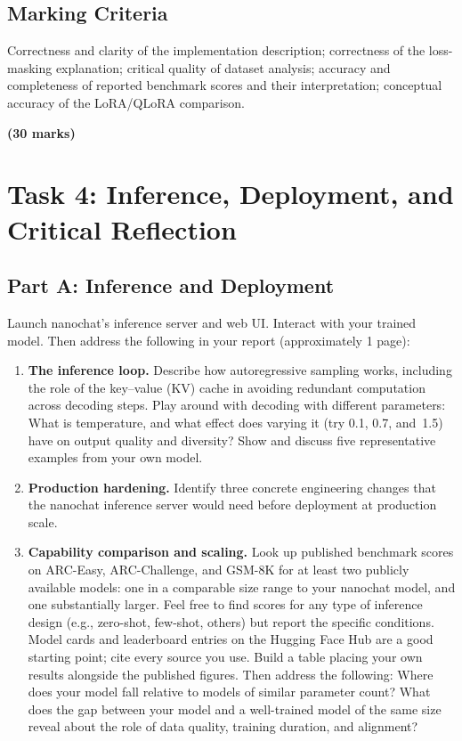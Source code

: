 \subsection{Marking Criteria}

Correctness and clarity of the implementation description; correctness of the loss-masking explanation; critical quality of dataset analysis; accuracy and completeness of reported benchmark scores and their interpretation; conceptual accuracy of the LoRA/QLoRA comparison.

\noindent\textbf{(30 marks)}

\section{Task 4: Inference, Deployment, and Critical Reflection}
\label{sec:task4}

\subsection{Part A: Inference and Deployment}

Launch nanochat's inference server and web UI. Interact with your trained model. Then address the following in your report (approximately 1 page):

\begin{enumerate}
    \item \textbf{The inference loop.}  Describe how autoregressive sampling works, including the role of the key--value (KV) cache in avoiding redundant computation across decoding steps. Play around with decoding with different parameters: What is temperature, and what effect does varying it (try 0.1, 0.7, and~1.5) have on output quality and diversity?  Show and discuss five representative examples from your own model.
    \item \textbf{Production hardening.}  Identify three concrete engineering changes that the nanochat inference server would need before deployment at production scale.
    \item \textbf{Capability comparison and scaling.}  Look up published benchmark scores on ARC-Easy, ARC-Challenge, and GSM-8K for at least two publicly available models: one in a comparable size range to your nanochat model, and one substantially larger. Feel free to find scores for any type of inference design (e.g., zero-shot, few-shot, others) but report the specific conditions. Model cards and leaderboard entries on the Hugging Face Hub are a good starting point; cite every source you use. Build a table placing your own results alongside the published figures. Then address the following: Where does your model fall relative to models of similar parameter count?  What does the gap between your model and a well-trained model of the same size reveal about the role of data quality, training duration, and alignment?
\end{enumerate}

